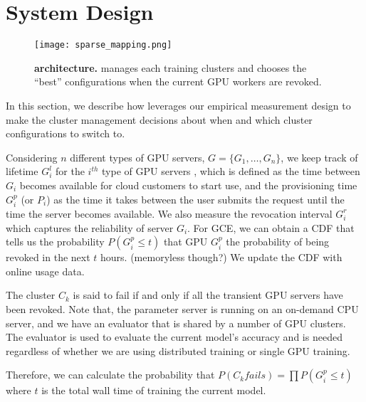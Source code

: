 \section{System Design}

\begin{figure}[t]
\centering
    \texttt{[image: sparse\_mapping.png]}
\caption{ \textbf{\sysname architecture.} \sysname manages each training clusters and chooses the ``best'' configurations when the current GPU workers are revoked.}
    \label{design:spottrain}
\end{figure}

In this section, we describe how \sysname leverages our empirical measurement design to make the cluster management decisions about when and which cluster configurations to switch to. 

Considering $n$ different types of GPU servers, $G = \{G_1, \dots, G_n\}$, we keep track of lifetime $G_i^l$ for the $i^{th}$ type of GPU servers , which is defined as the time between $G_i
$ becomes available for cloud customers to start use, and the provisioning time $G_i^p$ (or $P_i$) as the time it takes between the user submits the request until the time the server becomes available. 
We also measure the revocation interval $G_i^r$ which captures the reliability of server $G_i$. 
For GCE, we can obtain a CDF that tells us the probability $P(G_i^p \leq t)$ that GPU $G_i^p$ the probability of being revoked in the next $t$ hours. (memoryless though?) We update the CDF with online usage data. 

The cluster $C_k$ is said to fail if and only if all the transient GPU servers have been revoked. Note that, the parameter server is running on an on-demand CPU server, and we have an evaluator that is shared by a number of GPU clusters. The evaluator is used to evaluate the current model’s accuracy and is needed regardless of whether we are using distributed training or single GPU training. 

Therefore, we can calculate the probability that $P(C_k fails) = \prod P(G_i^p \leq t)$ where $t$ is the total wall time of training the current model. 


